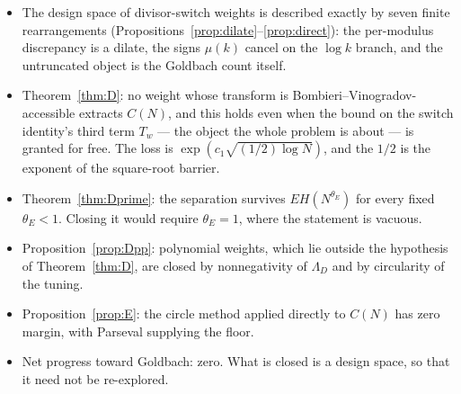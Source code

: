 \documentclass[11pt,a4paper]{article}
\theoremstyle{plain}
\theoremstyle{definition}
\theoremstyle{remark}
\begin{document}
\begin{itemize}
\item The design space of divisor-switch weights is described exactly
by seven finite rearrangements
(Propositions~\ref{prop:dilate}--\ref{prop:direct}): the per-modulus
discrepancy is a dilate, the signs $\mu(k)$ cancel on the $\log k$
branch, and the untruncated object is the Goldbach count itself.

\item Theorem~\ref{thm:D}: no weight whose transform is
Bombieri--Vinogradov-accessible extracts $C(N)$, and this holds even
when the bound on the switch identity's third term $T_w$ --- the object
the whole problem is about --- is granted for free. The loss is
$\exp(c_1\sqrt{(1/2)\log N})$, and the $1/2$ is the exponent of the
square-root barrier.

\item Theorem~\ref{thm:Dprime}: the separation survives
$EH(N^{\theta_E})$ for every fixed $\theta_E<1$. Closing it would
require $\theta_E=1$, where the statement is vacuous.

\item Proposition~\ref{prop:Dpp}: polynomial weights, which lie
outside the hypothesis of Theorem~\ref{thm:D}, are closed by
nonnegativity of $\Lambda_D$ and by circularity of the tuning.

\item Proposition~\ref{prop:E}: the circle method applied directly to
$C(N)$ has zero margin, with Parseval supplying the floor.

\item Net progress toward Goldbach: zero. What is closed is a design
space, so that it need not be re-explored.
\end{itemize}
\end{document}
